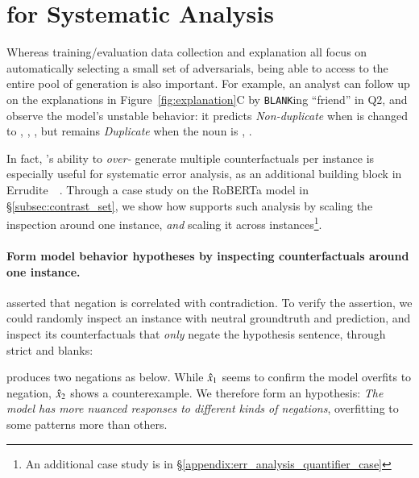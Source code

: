 \section{\sysname for Systematic Analysis}
\label{sec:app_err_analysis}

Whereas training/evaluation data collection and explanation all focus on automatically selecting a small set of adversarials, being able to access to the entire pool of generation is also important.
For example, an analyst can follow up on the explanations in Figure~\ref{fig:explanation}C by \texttt{BLANK}ing ``friend'' in Q2, and observe the model's unstable behavior: it predicts \emph{Non-duplicate} when  is changed to , , , but remains \emph{Duplicate} when the noun is , .

In fact, \sysname's ability to \emph{over-} generate multiple counterfactuals per instance is especially useful for systematic error analysis, \eg as an additional building block in Errudite~~\cite{wu2019errudite}.
Through a case study on the \nli RoBERTa model in \S\ref{subsec:contrast_set}, we show how \sysname supports such analysis by scaling the inspection around one instance, \emph{and} scaling it across instances\footnote{An additional case study is in \S\ref{appendix:err_analysis_quantifier_case}}.

\paragraph{Form model behavior hypotheses by inspecting counterfactuals around one instance.}
\citet{gururangan2018annotation} asserted that negation is correlated with contradiction. 
To verify the assertion, we could randomly inspect an instance with neutral groundtruth and prediction, and inspect its counterfactuals that \emph{only} negate the hypothesis sentence, through strict \tagstrs and blanks: 


\sysname produces two negations as below.
While $\hat{x}_1$ seems to confirm the model overfits to negation, $\hat{x}_2$ shows a counterexample. 
We therefore form an hypothesis: 
\emph{The model has more nuanced responses to different kinds of negations}, overfitting to some patterns more than others.

